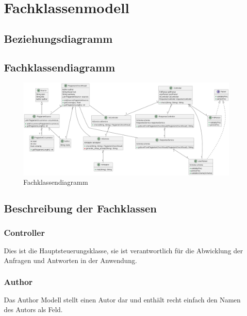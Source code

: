 \chapter{Fachklassenmodell}\label{ch:fachklassenmodell}


\section{Beziehungsdiagramm}\label{sec:beziehungsdiagramm}


\section{Fachklassendiagramm}\label{sec:fachklassendiagramm}
\begin{figure}[H]
    \centering
    \includegraphics[width=\textwidth]{images/diagrams/Klassendiagramm}
    \caption{Fachklassendiagramm}
    \label{fig:fachklassendiagrammw}
\end{figure}


\section{Beschreibung der Fachklassen}\label{sec:beschreibung_der_fachklassen}

\subsection{Controller}\label{subsec:controller}
Dies ist die Hauptsteuerungsklasse,
sie ist verantwortlich für die Abwicklung der Anfragen und Antworten in der Anwendung.

\subsection{Author}\label{subsec:author}
Das Author Modell stellt einen Autor dar und enthält recht einfach den Namen des Autors als Feld.


